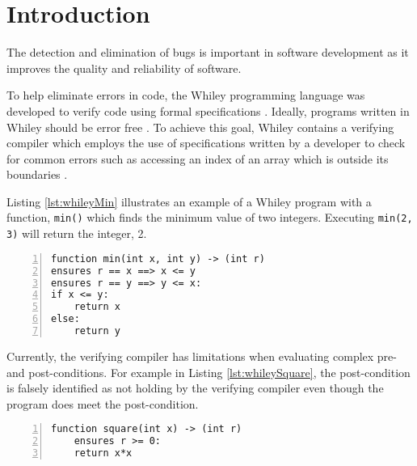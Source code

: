 \section{Introduction}\label{section:intro}



The detection and elimination of bugs is important in software development as it improves the quality and reliability of software.

To help eliminate errors in code, the Whiley programming language was developed to verify code using formal specifications \cite{WhileyLang}.
Ideally, programs written in Whiley should be error free \cite{WhileyLang}.
To achieve this goal, Whiley contains a verifying compiler which employs the use of specifications written by a developer to check for common errors such as accessing an index of an array which is outside its boundaries \cite{WhileyLang}.

Listing \ref{lst:whileyMin} illustrates an example of a Whiley program with a function,  \texttt{min()} which finds the minimum value of two integers. Executing \texttt{min(2, 3)} will return the integer, 2.

\begin{lstlisting}[language=Whiley, tabsize=3, numbers=left,
label={lst:whileyMin}, caption={Whiley program for the min function}]
function min(int x, int y) -> (int r)
ensures r == x ==> x <= y
ensures r == y ==> y <= x:
if x <= y:
	return x
else:
	return y
\end{lstlisting}

Currently, the verifying compiler has limitations when evaluating complex pre- and post-conditions.
For example in Listing \ref{lst:whileySquare}, the post-condition is falsely identified as not holding by the verifying compiler even though the program does meet the post-condition.

\begin{lstlisting}[language=Whiley, tabsize=3, numbers=left,
label={lst:whileySquare}, caption={Whiley program for the square function}]
function square(int x) -> (int r)
	ensures r >= 0:
	return x*x
\end{lstlisting}


